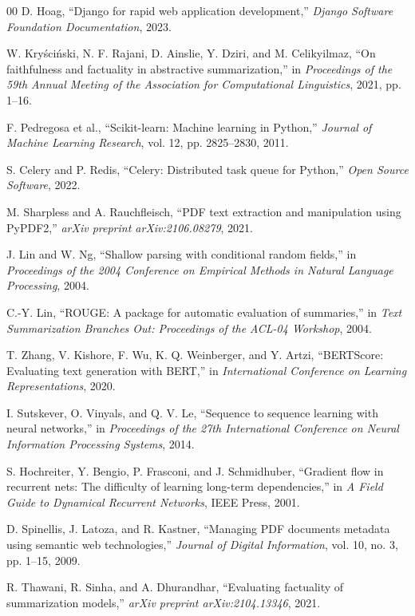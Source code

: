 \documentclass[conference]{IEEEtran}
\begin{document}
\begin{thebibliography}{00}
 D. Hoag, ``Django for rapid web application development,'' \textit{Django Software Foundation Documentation}, 2023.

 W. Kryściński, N. F. Rajani, D. Ainslie, Y. Dziri, and M. Celikyilmaz, ``On faithfulness and factuality in abstractive summarization,'' in \textit{Proceedings of the 59th Annual Meeting of the Association for Computational Linguistics}, 2021, pp. 1--16.

 F. Pedregosa et al., ``Scikit-learn: Machine learning in Python,'' \textit{Journal of Machine Learning Research}, vol. 12, pp. 2825--2830, 2011.

 S. Celery and P. Redis, ``Celery: Distributed task queue for Python,'' \textit{Open Source Software}, 2022.

 M. Sharpless and A. Rauchfleisch, ``PDF text extraction and manipulation using PyPDF2,'' \textit{arXiv preprint arXiv:2106.08279}, 2021.

 J. Lin and W. Ng, ``Shallow parsing with conditional random fields,'' in \textit{Proceedings of the 2004 Conference on Empirical Methods in Natural Language Processing}, 2004.

 C.-Y. Lin, ``ROUGE: A package for automatic evaluation of summaries,'' in \textit{Text Summarization Branches Out: Proceedings of the ACL-04 Workshop}, 2004.

 T. Zhang, V. Kishore, F. Wu, K. Q. Weinberger, and Y. Artzi, ``BERTScore: Evaluating text generation with BERT,'' in \textit{International Conference on Learning Representations}, 2020.

 I. Sutskever, O. Vinyals, and Q. V. Le, ``Sequence to sequence learning with neural networks,'' in \textit{Proceedings of the 27th International Conference on Neural Information Processing Systems}, 2014.

 S. Hochreiter, Y. Bengio, P. Frasconi, and J. Schmidhuber, ``Gradient flow in recurrent nets: The difficulty of learning long-term dependencies,'' in \textit{A Field Guide to Dynamical Recurrent Networks}, IEEE Press, 2001.

 D. Spinellis, J. Latoza, and R. Kastner, ``Managing PDF documents metadata using semantic web technologies,'' \textit{Journal of Digital Information}, vol. 10, no. 3, pp. 1--15, 2009.

 R. Thawani, R. Sinha, and A. Dhurandhar, ``Evaluating factuality of summarization models,'' \textit{arXiv preprint arXiv:2104.13346}, 2021.


\end{thebibliography}
\end{document}
